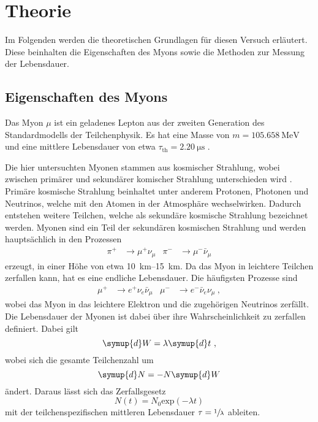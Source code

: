 \section{Theorie}
\label{sec:theorie}

Im Folgenden werden die theoretischen Grundlagen für diesen Versuch erläutert.
Diese beinhalten die Eigenschaften des Myons
sowie die Methoden zur Messung der Lebensdauer.


\subsection{Eigenschaften des Myons}

Das Myon $\mu$ ist ein geladenes Lepton aus der zweiten Generation des Standardmodells der Teilchenphysik.
Es hat eine Masse von $m = \SI{105.658}{\mega\eV}$ und eine mittlere Lebensdauer von etwa $\tau_\text{th} = \SI{2.20}{\micro\second}$ \cite{pdg}.

Die hier untersuchten Myonen stammen aus kosmischer Strahlung,
wobei zwischen primärer und sekundärer komischer Strahlung unterschieden wird \cite{grupen}.
Primäre kosmische Strahlung beinhaltet unter anderem Protonen,
Photonen und Neutrinos,
welche mit den Atomen in der Atmosphäre wechselwirken.
Dadurch entstehen weitere Teilchen,
welche als sekundäre kosmische Strahlung bezeichnet werden.
Myonen sind ein Teil der sekundären kosmischen Strahlung und werden hauptsächlich in den Prozessen
\begin{align*}
    \pi^{+} &\to \mu^{+}     \nu_{\mu} &
    \pi^{-} &\to \mu^{-} \bar\nu_{\mu}
\end{align*}
erzeugt,
in einer Höhe von etwa \SIrange{10}{15}{\kilo\meter}.
Da das Myon in leichtere Teilchen zerfallen kann,
hat es eine endliche Lebensdauer.
Die häufigsten Prozesse sind
\begin{align*}
    \mu^{+} &\to e^{+}     \nu_{e} \bar\nu_{\mu} &
    \mu^{-} &\to e^{-} \bar\nu_{e}     \nu_{\mu} \ ,
\end{align*}
wobei das Myon in das leichtere Elektron und die zugehörigen Neutrinos zerfällt.
Die Lebensdauer der Myonen ist dabei über ihre Wahrscheinlichkeit zu zerfallen definiert.
Dabei gilt
\begin{equation*}
    \symup{d}W = \lambda \symup{d}t \ ,
\end{equation*}
wobei sich die gesamte Teilchenzahl um
\begin{equation*}
    \symup{d}N = -N \symup{d}W
\end{equation*}
ändert.
Daraus lässt sich das Zerfallsgesetz
\begin{equation*}
    N(t) = N_0 \text{exp}(- \lambda t)
\end{equation*}
mit der teilchenspezifischen mittleren Lebensdauer $\tau = \sfrac{1}{\lambda}$ ableiten.



